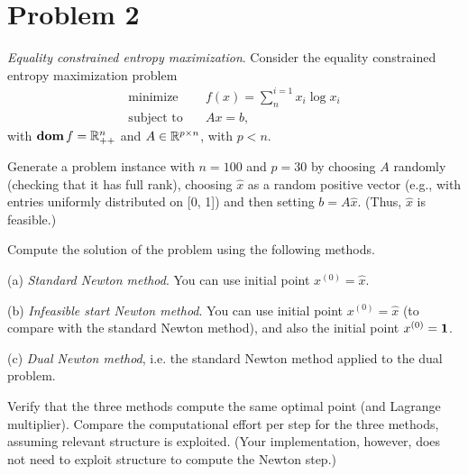 \documentclass[11pt]{article}
\begin{document}
\clearpage
\section*{Problem 2}
\textit{Equality constrained entropy maximization}. Consider the equality constrained entropy maximization problem
\begin{align*}
    \text{minimize}\quad & f(x) = \sum_{n}^{i=1} x_i \log x_i\\
    \text{subject to}\quad & Ax = b,
\end{align*}
with $\mathop{\textbf{dom}} f = {{\mathbb{R}}}^n_{++}$ and $A\in{{\mathbb{R}}}^{p\times n}$, with $p < n$.

Generate a problem instance with $n = 100$ and $p = 30$ by choosing $A$ randomly (checking that it has full rank), choosing $\hat x$ as a random positive vector (e.g., with entries uniformly distributed on [0, 1]) and then setting $b = A\hat x$. (Thus, $\hat x$ is feasible.)

Compute the solution of the problem using the following methods.

(a) \textit{Standard Newton method}. You can use initial point $x^{(0)} = \hat x$.

(b) \textit{Infeasible start Newton method}. You can use initial point $x^{(0)} = \hat x$ (to compare with the standard Newton method), and also the initial point $x^{(0)} = \mathbf 1$.

(c) \textit{Dual Newton method}, i.e. the standard Newton method applied to the dual problem.

Verify that the three methods compute the same optimal point (and Lagrange multiplier).
Compare the computational effort per step for the three methods, assuming relevant
structure is exploited. 
(Your implementation, however, does not need to exploit structure to compute the Newton step.)
\end{document}
